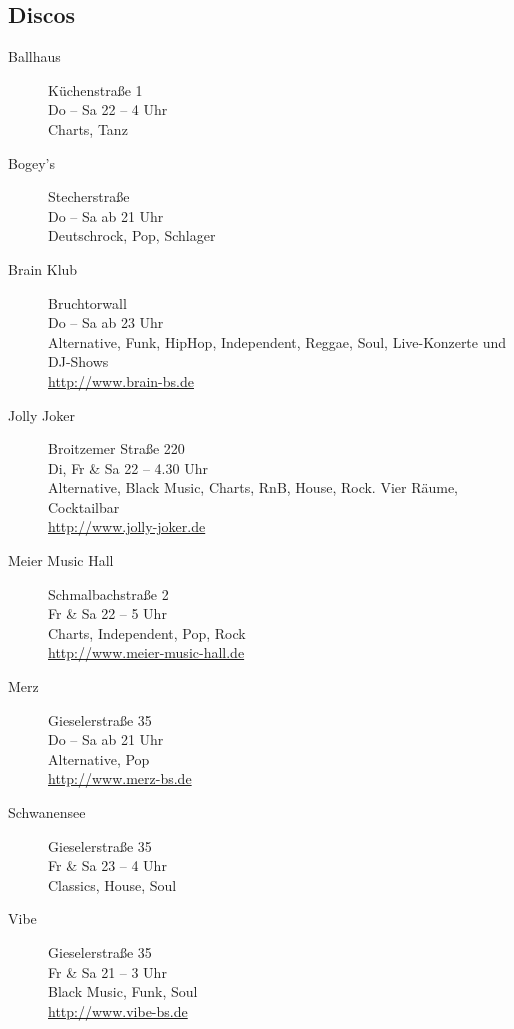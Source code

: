 \begin{multicols}{2}
\subsection{Discos}
	\begin{description}
		\item[Ballhaus] \hfill Küchenstraße 1\\
		Do -- Sa \hfill 22 -- 4 Uhr\\
		Charts, Tanz

		\item[Bogey's] \hfill Stecherstraße\\
		Do -- Sa \hfill ab 21 Uhr\\
		Deutschrock, Pop, Schlager

		\item[Brain Klub] \hfill Bruchtorwall\\
		Do -- Sa \hfill ab 23 Uhr\\
		Alternative, Funk, HipHop, Independent, Reggae, Soul, Live-Konzerte und DJ-Shows\\
		\url{http://www.brain-bs.de}

		\item[Jolly Joker] \hfill Broitzemer Straße 220\\
		Di, Fr \& Sa \hfill 22 -- 4.30 Uhr\\
		Alternative, Black Music, Charts, RnB, House, Rock. Vier Räume, Cocktailbar\\
		\url{http://www.jolly-joker.de}

		\item[Meier Music Hall] \hfill Schmalbachstraße 2\\
		Fr \& Sa \hfill 22 -- 5 Uhr\\
		Charts, Independent, Pop, Rock\\
		\url{http://www.meier-music-hall.de}

		\item[Merz] \hfill Gieselerstraße 35\\
		Do -- Sa \hfill ab 21 Uhr\\
		Alternative, Pop\\
		\url{http://www.merz-bs.de}

		\item[Schwanensee] \hfill Gieselerstraße 35\\
		Fr \& Sa \hfill 23 -- 4 Uhr\\
		Classics, House, Soul

		\item[Vibe] \hfill Gieselerstraße 35\\
		Fr \& Sa \hfill 21 -- 3 Uhr\\
		Black Music, Funk, Soul\\
		\url{http://www.vibe-bs.de}
	\end{description}


\end{multicols}
